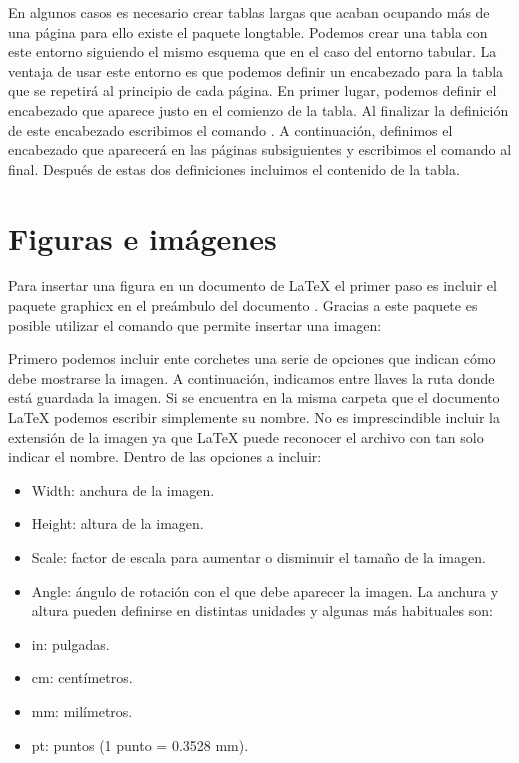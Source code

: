 \documentclass[11pt, a4paper]{article}
\begin{document}
En algunos casos es necesario crear tablas largas que acaban ocupando más de una página para ello existe el paquete longtable. Podemos crear una tabla con este entorno siguiendo el mismo esquema que en el caso del entorno tabular.  La ventaja de usar este entorno es que podemos definir un encabezado para la tabla que se repetirá al principio de cada página. En primer lugar, podemos definir el encabezado que aparece justo en el comienzo de la tabla. Al finalizar la definición de este encabezado escribimos el comando . A continuación, definimos el encabezado que aparecerá en las páginas subsiguientes y escribimos el comando  al final. Después de estas dos definiciones incluimos el contenido de la tabla.

\section{Figuras e imágenes}

Para insertar una figura en un documento de LaTeX el primer paso es incluir el paquete graphicx en el preámbulo del documento . Gracias a este paquete es posible utilizar el comando  que permite insertar una imagen:


Primero podemos incluir ente corchetes una serie de opciones que indican cómo debe mostrarse la imagen. A continuación, indicamos entre llaves la ruta donde está guardada la imagen. Si se encuentra en la misma carpeta que el documento LaTeX podemos escribir simplemente su nombre. No es imprescindible incluir la extensión de la imagen ya que LaTeX puede reconocer el archivo con tan solo indicar el nombre. Dentro de las opciones a incluir: 
\begin{itemize}
\item Width: anchura de la imagen.

\item Height: altura de la imagen.

\item Scale: factor de escala para aumentar o disminuir el tamaño de la imagen.

\item Angle: ángulo de rotación con el que debe aparecer la imagen.
La anchura y altura pueden definirse en distintas unidades y algunas más habituales son:

\item in: pulgadas.

\item cm: centímetros.

\item mm: milímetros.

\item pt: puntos (1 punto = 0.3528 mm).
\end{itemize}
\end{document}
